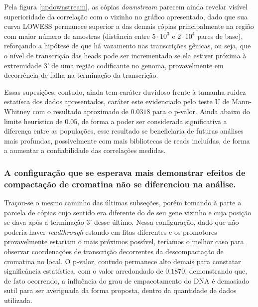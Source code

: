 \documentclass[12pt]{article}
\begin{document}
\begin{multicols}{2}
Pela figura \ref{updownstream}, as cópias \textit{downstream} parecem ainda revelar visível superioridade da correlação com o vizinho no gráfico apresentado, dado que sua curva LOWESS permanece superior a das demais cópias principalmente na região com maior número de amostras (distância entre \(5\cdot 10^3\) e \(2 \cdot 10^4\) pares de base), reforçando a hipótese de que há vazamento nas transcrições gênicas, ou seja, que o nível de transcrição das heads pode ser incrementado se ela estiver próxima à extremidade 3' de uma região codificante no genoma, provavelmente em decorrência de falha na terminação da transcrição.

Essas supesições, contudo, ainda tem caráter duvidoso frente à tamanha ruidez estatísca dos dados apresentados, caráter este evidenciado pelo teste U de Mann-Whitney com o resultado aproximado de \(0.0318\) para o p-valor. Ainda abaixo do limite heurístico de \(0.05\), de forma a poder ser considerada significativa a diferença entre as populações, esse resultado se beneficiaria de futuras análises mais profundas, possivelmente com mais bibliotecas de reads incluídas, de forma a aumentar a confiabilidade das correlações medidas.

\subsubsection{A configuração que se esperava mais demonstrar efeitos de compactação de cromatina não se diferenciou na análise.}
Traçou-se o mesmo caminho das últimas subseções, porém tomando à parte a parcela de cópias cujo sentido era diferente do de seu gene vizinho e cuja posição se dava após a terminação 3' desse último. Nessa configuração, dado que não poderia haver \textit{readthrough} estando em fitas diferentes e os promotores provavelmente estariam o mais próximos possível, teríamos o melhor caso para observar coordenações de transcrição decorrentes da descompactação de cromatina no local. O p-valor, contudo permanece alto demais para constatar significância estatística, com o valor arredondado de \(0.1870\), demonstrando que, de fato ocorrendo, a influência do grau de empacotamento do DNA é demasiado sutil para ser averiguada da forma proposta, dentro da quantidade de dados utilizada.


\end{multicols}
\end{document}
